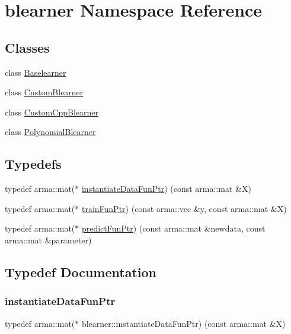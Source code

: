 \hypertarget{namespaceblearner}{}\section{blearner Namespace Reference}
\label{namespaceblearner}
\subsection*{Classes}
\begin{DoxyCompactItemize}
\item 
class \mbox{\hyperlink{classblearner_1_1_baselearner}{Baselearner}}
\item 
class \mbox{\hyperlink{classblearner_1_1_custom_blearner}{Custom\+Blearner}}
\item 
class \mbox{\hyperlink{classblearner_1_1_custom_cpp_blearner}{Custom\+Cpp\+Blearner}}
\item 
class \mbox{\hyperlink{classblearner_1_1_polynomial_blearner}{Polynomial\+Blearner}}
\end{DoxyCompactItemize}
\subsection*{Typedefs}
\begin{DoxyCompactItemize}
\item 
typedef arma\+::mat($\ast$ \mbox{\hyperlink{namespaceblearner_a10cec16134a934fb9defbdc2c2011f2a}{instantiate\+Data\+Fun\+Ptr}}) (const arma\+::mat \&X)
\item 
typedef arma\+::mat($\ast$ \mbox{\hyperlink{namespaceblearner_a5e2b38edf05e32681bee136af9ae505d}{train\+Fun\+Ptr}}) (const arma\+::vec \&y, const arma\+::mat \&X)
\item 
typedef arma\+::mat($\ast$ \mbox{\hyperlink{namespaceblearner_a93d5b51440d434704d2bde9dee652f6e}{predict\+Fun\+Ptr}}) (const arma\+::mat \&newdata, const arma\+::mat \&parameter)
\end{DoxyCompactItemize}


\subsection{Typedef Documentation}
\mbox{\label{namespaceblearner_a10cec16134a934fb9defbdc2c2011f2a}} 
\subsubsection{\texorpdfstring{instantiate\+Data\+Fun\+Ptr}{instantiateDataFunPtr}}
{\footnotesize\ttfamily typedef arma\+::mat($\ast$ blearner\+::instantiate\+Data\+Fun\+Ptr) (const arma\+::mat \&X)}

